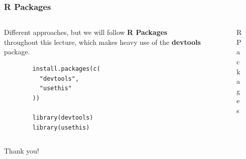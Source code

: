 \documentclass[aspectratio=1610,onlytextwidth]{beamer}
\begin{document}
\begin{frame}[c,fragile]
  \frametitle{R Packages}

  \begin{columns}
    \begin{column}{0.45\textwidth}
      Different approaches, but we will follow \textbf{R Packages}~\parencite{wickhamPackagesOrganizeTest2023} throughout
      this lecture, which makes heavy use of the \textbf{devtools} package.

      \begin{lstlisting}
        install.packages(c(
          "devtools",
          "usethis"
        ))

        library(devtools)
        library(usethis)
      \end{lstlisting}
    \end{column}
    \begin{column}{0.45\textwidth}
      \begin{figure}[htpb]
        \centering
        \caption{%
          R Packages
        }
      \end{figure}%
    \end{column}
  \end{columns}

\end{frame}

\begin{frame}[standout]
  Thank you!
\end{frame}

\appendix

\end{document}
